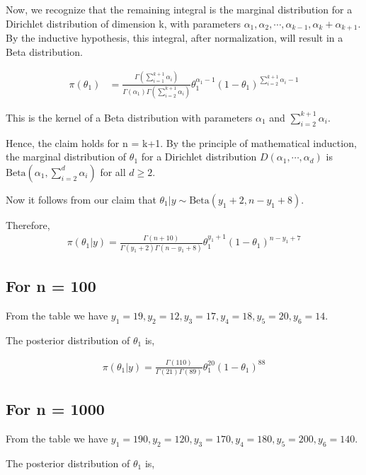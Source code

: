 \documentclass[a4paper]{article}
\begin{document}
Now, we recognize that the remaining integral is the marginal distribution for a Dirichlet distribution of dimension k, with parameters \(\alpha_1, \alpha_2, \cdots, \alpha_{k-1}, \alpha_k + \alpha_{k+1}\). By the inductive hypothesis, this integral, after normalization, will result in a Beta distribution.

\begin{align*}
    \pi(\theta_1) &= \frac{\Gamma(\sum_{i=1}^{k+1} \alpha_i)}{\Gamma(\alpha_1) \Gamma(\sum_{i=2}^{k+1} \alpha_i)} \theta_1^{\alpha_1 - 1} (1 - \theta_1)^{\sum_{i=2}^{k+1} \alpha_i - 1}
\end{align*}

This is the kernel of a Beta distribution with parameters \(\alpha_1\) and \(\sum_{i=2}^{k+1} \alpha_i\).

Hence, the claim holds for n = k+1. By the principle of mathematical induction, the marginal distribution of \(\theta_1\) for a Dirichlet distribution \(D(\alpha_1, \cdots, \alpha_d)\) is \(\text{Beta}(\alpha_1, \sum_{i=2}^{d} \alpha_i)\) for all \(d \geq 2\).

\vspace{0.25cm}

Now it follows from our claim that \(\theta_1|y \sim \text{Beta}(y_1+2, n - y_1 + 8)\).

Therefore,
\begin{align*}
    \pi(\theta_1|y) = \frac{\Gamma(n+10)}{\Gamma(y_1+2)\Gamma(n-y_1+8)}\theta_1^{y_1+1}(1-\theta_1)^{n-y_1+7}
\end{align*}

\subsection*{For n = 100}
From the table we have \(y_1 = 19, y_2 = 12, y_3 = 17, y_4 = 18, y_5 = 20, y_6 =14 \).

The posterior distribution of \(\theta_1\) is,

\begin{align*}
    \pi(\theta_1|y) = \frac{\Gamma(110)}{\Gamma(21)\Gamma(89)}\theta_1^{20}(1-\theta_1)^{88}
\end{align*}

\subsection*{For n = 1000}
From the table we have \(y_1 = 190, y_2 = 120, y_3 = 170, y_4 = 180, y_5 = 200, y_6 =140 \).

The posterior distribution of \(\theta_1\) is,
\end{document}
